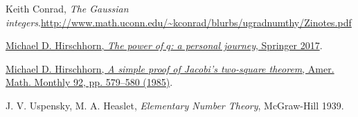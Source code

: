 \documentclass[paper=a4, fontsize=12pt]{scrartcl}%
\theoremstyle{plainsl}
\theoremstyle{definition}
\theoremstyle{remark}
\begin{document}
\begin{thebibliography}{99999999}                                                                                         %


Keith Conrad, \textit{The Gaussian
integers}.\newline\url{http://www.math.uconn.edu/~kconrad/blurbs/ugradnumthy/Zinotes.pdf}

%
\href{https://doi.org/10.1007/978-3-319-57762-3}{Michael D. Hirschhorn,
\textit{The power of }$q$\textit{: a personal journey}, Springer 2017}.

%
\href{https://web.maths.unsw.edu.au/~mikeh/webpapers/paper21.pdf}{Michael D.
Hirschhorn, \textit{A simple proof of Jacobi's two-square theorem}, Amer.
Math. Monthly 92, pp. 579--580 (1985)}.

J. V. Uspensky, M. A. Heaslet,
\textit{Elementary Number Theory}, McGraw-Hill 1939.
\end{thebibliography}
\end{document}
